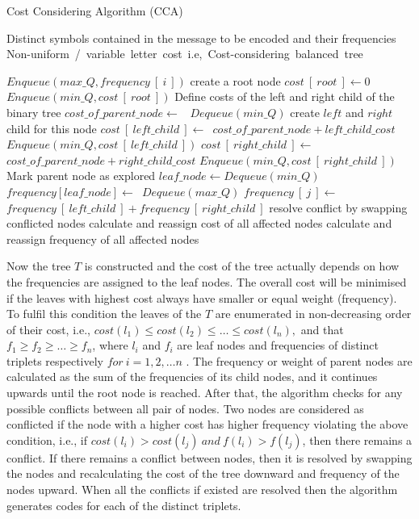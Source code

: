 \documentclass{singlecol-new}
\theoremstyle{TH}{
\newtheorem{lemma}{Lemma}
\newtheorem{theorem}[lemma]{Theorem}
\newtheorem{corrolary}[lemma]{Corrolary}
\newtheorem{conjecture}[lemma]{Conjecture}
\newtheorem{proposition}[lemma]{Proposition}
\newtheorem{claim}[lemma]{Claim}
\newtheorem{stheorem}[lemma]{Wrong Theorem}
}
\theoremstyle{THrm}{
\newtheorem{definition}{Definition}
\newtheorem{question}{Question}
\newtheorem{remark}{Remark}
\newtheorem{scheme}{Scheme}
}
\theoremstyle{THhit}{
\newtheorem{case}{Case}[section]
}
\begin{document}
\begin{algorithm}[t]
\caption{Cost Considering Algorithm (CCA)}
\label{alg1}

\begin{algorithmic}[1]
\REQUIRE Distinct symbols contained in the message to be encoded and their frequencies 
\ENSURE Non-uniform\ /\ variable\ letter\ cost\ i.e,\ Cost-considering\ balanced\ tree

\STATE $ Enqueue\left(max\_Q , frequency~[~i~]\right)$
\ENDFOR
\STATE create a root node
\STATE $cost~[~root~]\leftarrow 0$
\STATE $Enqueue\left(min\_Q , cost~[~root~]\right)$
\STATE Define costs of the left and right child of the binary tree
\REPEAT 
\STATE $cost\_of\_parent\_node\leftarrow$~ $Dequeue\left(min\_Q\right)$
\STATE create $left$ and $right$ child for this node
\STATE $cost~[~left\_child~]\leftarrow$~$ cost\_of\_parent\_node+left\_child\_cost$
\STATE $Enqueue\left(min\_Q , cost~[~left\_child~]\right)$
\STATE $cost~[~right\_child~]\leftarrow$~$ cost\_of\_parent\_node+right\_child\_cost$
\STATE $Enqueue\left(min\_Q , cost~[~right\_child~]\right)$
\STATE Mark parent node as explored
\STATE $leaf\_node\leftarrow Dequeue\left(min\_Q\right)$
\STATE $frequency[leaf\_node]\leftarrow$~$ Dequeue\left(max\_Q\right)$
\ENDWHILE
{} 
\STATE $frequency~[~j~]\leftarrow$~$ frequency~[~left\_child~]+frequency~[~right\_child~]$
\ENDFOR
\REPEAT
{} 
\STATE resolve conflict by swapping conflicted nodes
\STATE calculate and reassign cost of all affected nodes
\STATE calculate and reassign frequency of all affected nodes 
\ENDIF
{}
\end{algorithmic}
\end{algorithm}

Now the tree $T$ is constructed and the cost of the tree actually depends on how the frequencies are assigned to the leaf nodes. The overall cost will be minimised if the leaves with highest cost always have smaller or equal weight (frequency). To fulfil this condition the leaves of the $T$ are enumerated in non-decreasing order of their cost, i.e., $cost(l_1)\leq cost(l_2)\leq \ldots \leq cost(l_n),$ and that $f_1 \geq f_2 \geq \ldots\geq f_n$, where $l_i$ and $f_i$ are leaf nodes and frequencies of distinct triplets respectively $for~ i=1,2,\ldots n$ . The frequency or weight of parent nodes are calculated as the sum of the frequencies of its child nodes, and it continues upwards until the root node is reached. After that, the algorithm checks for any possible conflicts between all pair of nodes. Two nodes are considered as conflicted if the node with a higher cost has higher frequency violating the above condition, i.e., if $cost(l_i)> cost(l_j)~and~f(l_i)>f(l_j)$, then there remains a conflict.  If there remains a conflict between nodes, then it is resolved by swapping the nodes and recalculating the cost of the tree downward and frequency of the nodes upward.  When all the conflicts if existed are resolved then the algorithm generates codes for each of the distinct triplets.
\end{document}

